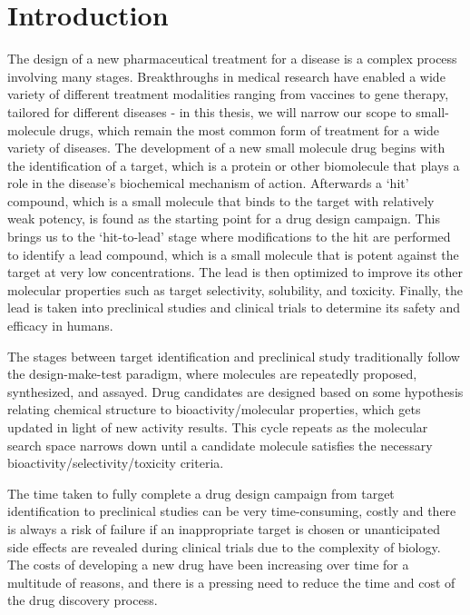 \chapter{Introduction} \label{ch:intro}

The design of a new pharmaceutical treatment for a disease is a complex process involving many stages. Breakthroughs in medical research have enabled a wide variety of different treatment modalities ranging from vaccines to gene therapy, tailored for different diseases - in this thesis, we will narrow our scope to small-molecule drugs, which remain the most common form of treatment for a wide variety of diseases. The development of a new small molecule drug begins with the identification of a target, which is a protein or other biomolecule that plays a role in the disease's biochemical mechanism of action. Afterwards a `hit' compound, which is a small molecule that binds to the target with relatively weak potency, is found as the starting point for a drug design campaign. This brings us to the `hit-to-lead' stage where modifications to the hit are performed to identify a lead compound, which is a small molecule that is potent against the target at very low concentrations. The lead is then optimized to improve its other molecular properties such as target selectivity, solubility, and toxicity. Finally, the lead is taken into preclinical studies and clinical trials to determine its safety and efficacy in humans.

The stages between target identification and preclinical study traditionally follow the design-make-test paradigm, where molecules are repeatedly proposed, synthesized, and assayed. Drug candidates are designed based on some hypothesis relating chemical structure to bioactivity/molecular properties, which gets updated in light of new activity results. This cycle repeats as the molecular search space narrows down until a candidate molecule satisfies the necessary bioactivity/selectivity/toxicity criteria.

The time taken to fully complete a drug design campaign from target identification to preclinical studies can be very time-consuming, costly and there is always a risk of failure if an inappropriate target is chosen or unanticipated side effects are revealed during clinical trials due to the complexity of biology. The costs of developing a new drug have been increasing over time for a multitude of reasons, and there is a pressing need to reduce the time and cost of the drug discovery process.

